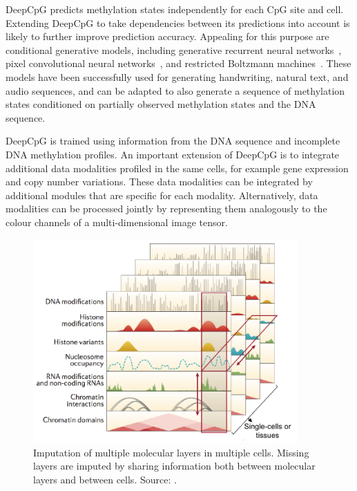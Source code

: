 DeepCpG predicts methylation states independently for each CpG site and cell. Extending DeepCpG to take dependencies between its predictions into account is likely to further improve prediction accuracy. Appealing for this purpose are conditional generative models, including generative recurrent neural networks~\citep{graves_generating_2013, chung_recurrent_2015}, pixel convolutional neural networks~\citep{oord_pixel_2016,kalchbrenner_neural_2016,oord_wavenet:_2016}, and restricted Boltzmann machines~\citep{sutskever_recurrent_2009,boulanger-lewandowski_modeling_2012,boulanger-lewandowski_high-dimensional_2013,bayer_learning_2014}. These models have been successfully used for generating handwriting, natural text, and audio sequences, and can be adapted to also generate a sequence of methylation states conditioned on partially observed methylation states and the DNA sequence.

DeepCpG is trained using information from the DNA sequence and incomplete DNA methylation profiles. An important extension of DeepCpG is to integrate additional data modalities profiled in the same cells, for example gene expression and copy number variations. These data modalities can be integrated by additional modules that are specific for each modality. Alternatively, data modalities can be processed jointly by representing them analogously to the colour channels of a multi-dimensional image tensor.

\begin{figure}[htbp!]
\centering
\includegraphics[width=0.9\textwidth]{multi}
\caption[Imputation of multiple molecular layers in multiple cells.]{Imputation of multiple molecular layers in multiple cells. Missing layers are imputed by sharing information both between molecular layers and between cells. Source: \citet{stricker_profiles_2016}.}
\label{fig:sum_multi}
\end{figure}

